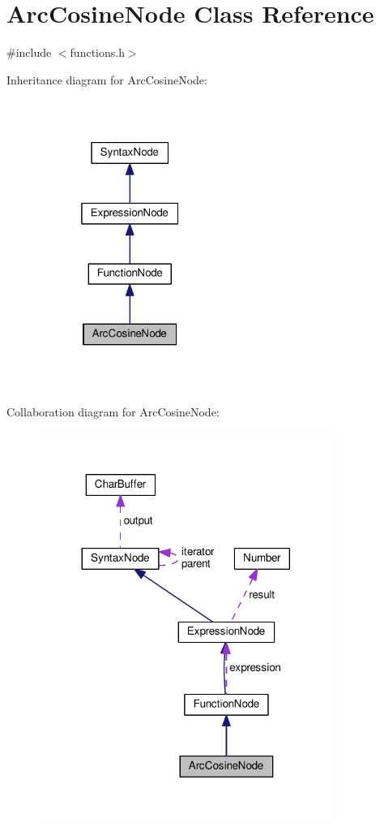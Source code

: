 \hypertarget{classArcCosineNode}{}\section{Arc\+Cosine\+Node Class Reference}
\label{classArcCosineNode}


{\ttfamily \#include $<$functions.\+h$>$}



Inheritance diagram for Arc\+Cosine\+Node\+:
\nopagebreak
\begin{figure}[H]
\begin{center}
\leavevmode
\includegraphics[width=169pt]{d5/de8/classArcCosineNode__inherit__graph}
\end{center}
\end{figure}


Collaboration diagram for Arc\+Cosine\+Node\+:
\nopagebreak
\begin{figure}[H]
\begin{center}
\leavevmode
\includegraphics[width=272pt]{dc/df5/classArcCosineNode__coll__graph}
\end{center}
\end{figure}
